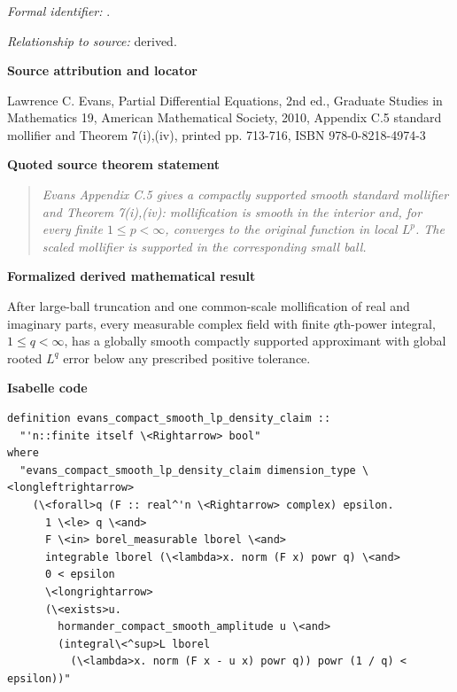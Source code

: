 \documentclass[10pt,oneside]{article}
\newenvironment{sourcequote}{\begin{quote}\itshape}{\end{quote}}
\newcommand{\reviewlabel}[1]{\par\smallskip\noindent\textsf{\bfseries #1}\par\smallskip}
\begin{document}
\subsubsection{\texttt{}}
\noindent\textit{Formal identifier:} \texttt{}.\par
\noindent\textit{Relationship to source:} derived.

\reviewlabel{Source attribution and locator}
Lawrence C. Evans, Partial Differential Equations, 2nd ed., Graduate Studies in Mathematics 19, American Mathematical Society, 2010, Appendix C.5 standard mollifier and Theorem 7(i),(iv), printed pp. 713-716, ISBN 978-0-8218-4974-3

\reviewlabel{Quoted source theorem statement}
\begin{sourcequote}
Evans Appendix C.5 gives a compactly supported smooth standard mollifier and Theorem 7(i),(iv): mollification is smooth in the interior and, for every finite $1\leq p<\infty$, converges to the original function in local $L^p$. The scaled mollifier is supported in the corresponding small ball.
\end{sourcequote}

\reviewlabel{Formalized derived mathematical result}
After large-ball truncation and one common-scale mollification of real and imaginary parts, every measurable complex field with finite $q$th-power integral, $1\leq q<\infty$, has a globally smooth compactly supported approximant with global rooted $L^q$ error below any prescribed positive tolerance.

\reviewlabel{Isabelle code}
\begin{lstlisting}
definition evans_compact_smooth_lp_density_claim ::
  "'n::finite itself \<Rightarrow> bool"
where
  "evans_compact_smooth_lp_density_claim dimension_type \<longleftrightarrow>
    (\<forall>q (F :: real^'n \<Rightarrow> complex) epsilon.
      1 \<le> q \<and>
      F \<in> borel_measurable lborel \<and>
      integrable lborel (\<lambda>x. norm (F x) powr q) \<and>
      0 < epsilon
      \<longrightarrow>
      (\<exists>u.
        hormander_compact_smooth_amplitude u \<and>
        (integral\<^sup>L lborel
          (\<lambda>x. norm (F x - u x) powr q)) powr (1 / q) < epsilon))"
\end{lstlisting}
\end{document}
